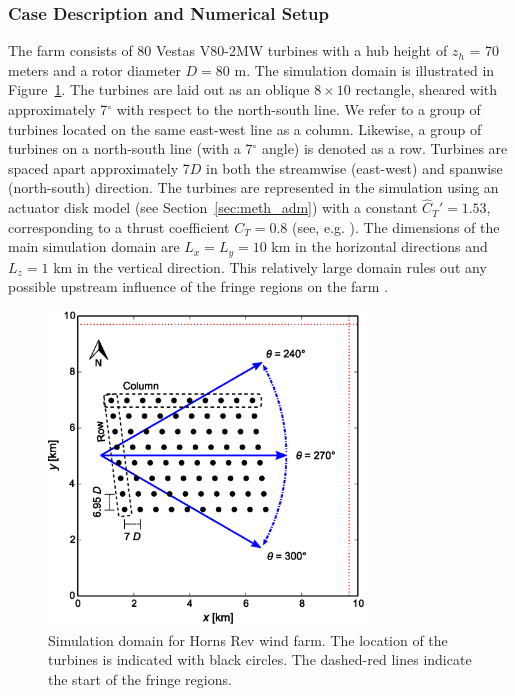 		\subsubsection{Case Description and Numerical Setup}
		
		The farm consists of 80 Vestas V80-2MW turbines with a hub height of $z_h$ = 70 meters and a rotor diameter $D = 80$ m. The simulation
		domain is illustrated in Figure~\ref{fig:hornsrevlayout}.  The turbines are laid out as an oblique $8 \times 10$ rectangle, sheared with
		approximately 7$^\circ$ with respect to the north-south line. We refer to a group of turbines located on the same east-west line as a
		column. Likewise, a group of turbines on a north-south line (with a 7$^\circ$ angle) is denoted as a row. Turbines are spaced apart
		approximately 7$D$ in both the streamwise (east-west) and spanwise (north-south) direction. The turbines are represented in the
		simulation using an actuator disk model (see Section~\ref{sec:meth_adm}) with a constant $\widehat{C}_T' = 1.53$, corresponding to a
		thrust coefficient $C_T = 0.8$ (see, e.g. \citealp{wu2015modeling,stevens2015using}). The  dimensions of the main simulation domain are $L_x = L_y = 10$ km in the horizontal directions and $L_z = 1$ km in the vertical direction. This relatively large domain
		rules out any possible upstream influence of the fringe regions on the farm \citep{lundbladh1999efficient,nordstrom1999fringe}.
		
		\begin{figure}[h]
			\centering
			\includegraphics[width=0.75\textwidth]{chapters/turbulent_inflow/blm/figure9.eps}
			\caption[Simulation domain for Horns Rev wind farm.]{Simulation domain for Horns Rev wind farm. The location of the turbines is indicated with black circles. The dashed-red lines indicate the start of the fringe regions.}
			\label{fig:hornsrevlayout}
		\end{figure}

